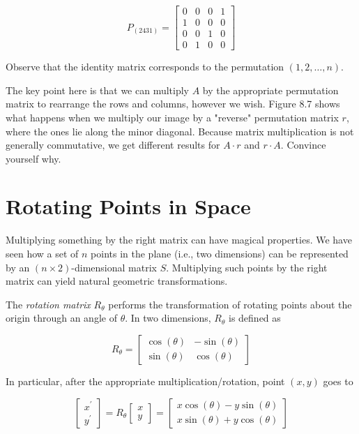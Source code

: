 \documentclass[10pt]{article}
\begin{document}
\[
P_{(2431)} = \begin{bmatrix}
0 & 0 & 0 & 1 \\
1 & 0 & 0 & 0 \\
0 & 0 & 1 & 0 \\
0 & 1 & 0 & 0
\end{bmatrix}
\]

Observe that the identity matrix corresponds to the permutation \((1,2,\ldots,n)\).

The key point here is that we can multiply \(A\) by the appropriate permutation matrix to rearrange the rows and columns, however we wish. Figure 8.7 shows what happens when we multiply our image by a "reverse" permutation matrix \(r\), where the ones lie along the minor diagonal. Because matrix multiplication is not generally commutative, we get different results for \(A \cdot r\) and \(r \cdot A\). Convince yourself why.

\section*{Rotating Points in Space}
Multiplying something by the right matrix can have magical properties. We have seen how a set of \(n\) points in the plane (i.e., two dimensions) can be represented by an \((n \times 2)\)-dimensional matrix \(S\). Multiplying such points by the right matrix can yield natural geometric transformations.

The \textit{rotation matrix} \(R_{\theta}\) performs the transformation of rotating points about the origin through an angle of \(\theta\). In two dimensions, \(R_{\theta}\) is defined as

\[
R_{\theta} = \begin{bmatrix}
\cos (\theta) & -\sin (\theta) \\
\sin (\theta) & \cos (\theta)
\end{bmatrix}
\]

In particular, after the appropriate multiplication/rotation, point \((x, y)\) goes to

\[
\begin{bmatrix}
x^{\prime} \\
y^{\prime}
\end{bmatrix} = R_{\theta}\begin{bmatrix}
x \\
y
\end{bmatrix} = \begin{bmatrix}
x \cos (\theta) - y \sin (\theta) \\
x \sin (\theta) + y \cos (\theta)
\end{bmatrix}
\]
\end{document}
